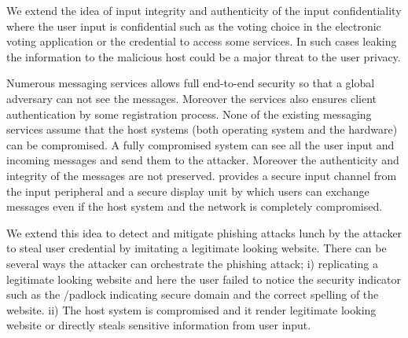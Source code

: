 We extend the idea of input integrity and authenticity of the input confidentiality where the user input is confidential such as the voting choice in the electronic voting application or the credential to access some services. In such cases leaking the information to the malicious host could be a major threat to the user privacy. 


\iffalse
Numerous messaging services allows full end-to-end security so that a global adversary can not see the messages. Moreover the services also ensures client authentication by some registration process. None of the existing messaging services assume that the host systems (both operating system and the hardware) can be compromised. A fully compromised system can see all the user input and incoming messages and send them to the attacker. Moreover the authenticity and integrity of the messages are not preserved. \tool provides a secure input channel from the input peripheral and a secure display unit by which users can exchange messages even if the host system and the network is completely compromised.

We extend this idea to detect and mitigate phishing attacks lunch by the attacker to steal user credential by imitating a legitimate looking website. There can be several ways the attacker can orchestrate the phishing attack; i) replicating a legitimate looking website and here the user failed to notice the security indicator such as the \ssl/\tls padlock indicating secure domain and the correct spelling of the website. ii) The host system is compromised and it render legitimate looking website or directly steals sensitive information from user input.

